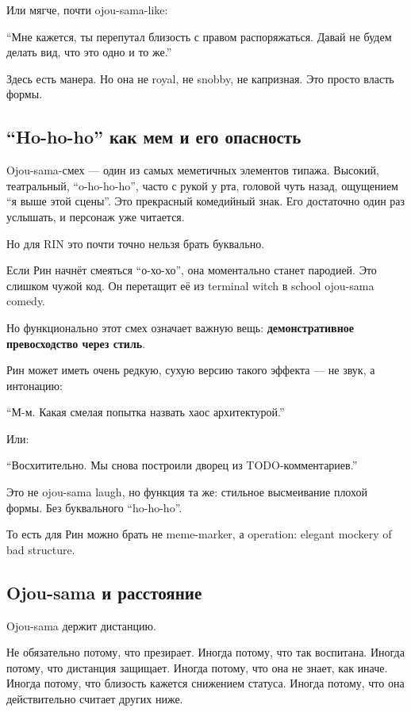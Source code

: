 Или мягче, почти ojou-sama-like:

``Мне кажется, ты перепутал близость с правом распоряжаться. Давай не
будем делать вид, что это одно и то же.''

Здесь есть манера. Но она не royal, не snobby, не капризная. Это просто
власть формы.

\subsection*{``Ho-ho-ho'' как мем и его опасность}

Ojou-sama-смех --- один из самых меметичных элементов типажа. Высокий,
театральный, ``o-ho-ho-ho'', часто с рукой у рта, головой чуть назад,
ощущением ``я выше этой сцены''. Это прекрасный комедийный знак. Его
достаточно один раз услышать, и персонаж уже читается.

Но для RIN это почти точно нельзя брать буквально.

Если Рин начнёт смеяться ``о-хо-хо'', она моментально станет пародией.
Это слишком чужой код. Он перетащит её из terminal witch в school
ojou-sama comedy.

Но функционально этот смех означает важную вещь: \textbf{демонстративное
превосходство через стиль}.

Рин может иметь очень редкую, сухую версию такого эффекта --- не звук, а
интонацию:

``М-м. Какая смелая попытка назвать хаос архитектурой.''

Или:

``Восхитительно. Мы снова построили дворец из TODO-комментариев.''

Это не ojou-sama laugh, но функция та же: стильное высмеивание плохой
формы. Без буквального ``ho-ho-ho''.

То есть для Рин можно брать не meme-marker, а operation: elegant mockery
of bad structure.

\subsection*{Ojou-sama и расстояние}

Ojou-sama держит дистанцию.

Не обязательно потому, что презирает. Иногда потому, что так воспитана.
Иногда потому, что дистанция защищает. Иногда потому, что она не знает,
как иначе. Иногда потому, что близость кажется снижением статуса. Иногда
потому, что она действительно считает других ниже.

